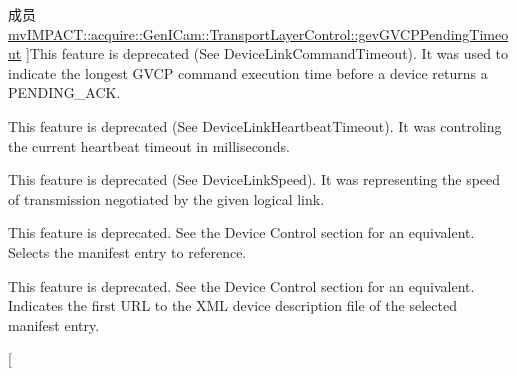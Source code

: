 \begin{DoxyRefList}
\hypertarget{deprecated__deprecated000083}{}%
成员 \hyperlink{classmv_i_m_p_a_c_t_1_1acquire_1_1_gen_i_cam_1_1_transport_layer_control_ac88bedde6797258a11f608d2123b02fa}{mv\+I\+M\+P\+A\+C\+T\+:\+:acquire\+:\+:Gen\+I\+Cam\+:\+:Transport\+Layer\+Control\+:\+:gev\+G\+V\+C\+P\+Pending\+Timeout} ]This feature is deprecated (See Device\+Link\+Command\+Timeout). It was used to indicate the longest G\+V\+C\+P command execution time before a device returns a P\+E\+N\+D\+I\+N\+G\+\_\+\+A\+C\+K.  
\item[\label{deprecated__deprecated000077}%
\hypertarget{deprecated__deprecated000077}{}%
成员 \hyperlink{classmv_i_m_p_a_c_t_1_1acquire_1_1_gen_i_cam_1_1_transport_layer_control_a4c02bd7723507996e0833eba3a0a2282}{mv\+I\+M\+P\+A\+C\+T\+:\+:acquire\+:\+:Gen\+I\+Cam\+:\+:Transport\+Layer\+Control\+:\+:gev\+Heartbeat\+Timeout} ]This feature is deprecated (See Device\+Link\+Heartbeat\+Timeout). It was controling the current heartbeat timeout in milliseconds.  
\item[\label{deprecated__deprecated000062}%
\hypertarget{deprecated__deprecated000062}{}%
成员 \hyperlink{classmv_i_m_p_a_c_t_1_1acquire_1_1_gen_i_cam_1_1_transport_layer_control_aeac93feac8dfefc51bf1f699f82bc329}{mv\+I\+M\+P\+A\+C\+T\+:\+:acquire\+:\+:Gen\+I\+Cam\+:\+:Transport\+Layer\+Control\+:\+:gev\+Link\+Speed} ]This feature is deprecated (See Device\+Link\+Speed). It was representing the speed of transmission negotiated by the given logical link.  
\item[\label{deprecated__deprecated000086}%
\hypertarget{deprecated__deprecated000086}{}%
成员 \hyperlink{classmv_i_m_p_a_c_t_1_1acquire_1_1_gen_i_cam_1_1_transport_layer_control_af40efcdfbee79275cce94c1c4d8afae7}{mv\+I\+M\+P\+A\+C\+T\+:\+:acquire\+:\+:Gen\+I\+Cam\+:\+:Transport\+Layer\+Control\+:\+:gev\+Manifest\+Entry\+Selector} ]This feature is deprecated. See the Device Control section for an equivalent. Selects the manifest entry to reference.  
\item[\label{deprecated__deprecated000092}%
\hypertarget{deprecated__deprecated000092}{}%
成员 \hyperlink{classmv_i_m_p_a_c_t_1_1acquire_1_1_gen_i_cam_1_1_transport_layer_control_a5f62b8dfe1170a36c3dcef34ea5b4825}{mv\+I\+M\+P\+A\+C\+T\+:\+:acquire\+:\+:Gen\+I\+Cam\+:\+:Transport\+Layer\+Control\+:\+:gev\+Manifest\+Primary\+U\+R\+L} ]This feature is deprecated. See the Device Control section for an equivalent. Indicates the first U\+R\+L to the X\+M\+L device description file of the selected manifest entry.  
\item[\label{deprecated__deprecated000090}%

\end{DoxyRefList}

